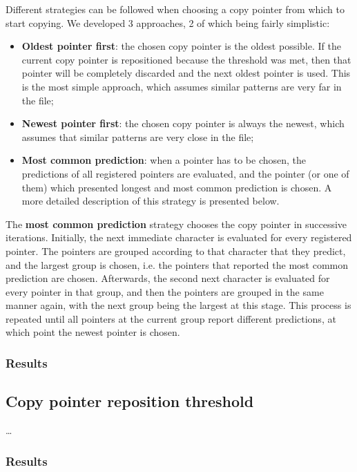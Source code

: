 \documentclass{article}
\begin{document}
Different strategies can be followed when choosing a copy pointer from which to start copying.
We developed 3 approaches, 2 of which being fairly simplistic:
\begin{itemize}
    \item \textbf{Oldest pointer first}: the chosen copy pointer is the oldest possible. If the current copy pointer is repositioned because the threshold was met, then that pointer will be completely discarded and the next oldest pointer is used.
    This is the most simple approach, which assumes similar patterns are very far in the file;
    \item \textbf{Newest pointer first}: the chosen copy pointer is always the newest, which assumes that similar patterns are very close in the file;
    \item \textbf{Most common prediction}: when a pointer has to be chosen, the predictions of all registered pointers are evaluated, and the pointer (or one of them) which presented longest and most common prediction is chosen.
    A more detailed description of this strategy is presented below.
\end{itemize}

The \textbf{most common prediction} strategy chooses the copy pointer in successive iterations.
Initially, the next immediate character is evaluated for every registered pointer.
The pointers are grouped according to that character that they predict, and the largest group is chosen, i.e. the pointers that reported the most common prediction are chosen.
Afterwards, the second next character is evaluated for every pointer in that group, and then the pointers are grouped in the same manner again, with the next group being the largest at this stage.
This process is repeated until all pointers at the current group report different predictions, at which point the newest pointer is chosen.

\subsubsection{Results}

\subsection{Copy pointer reposition threshold}

\dots

\subsubsection{Results}
\end{document}

